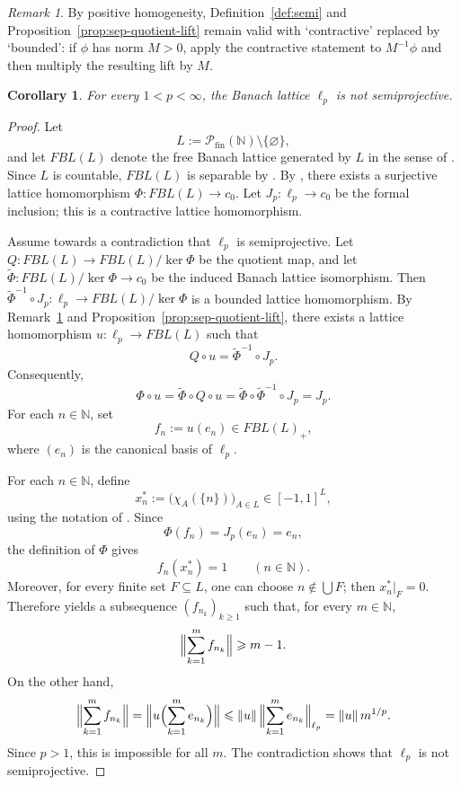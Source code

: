 \documentclass[11pt]{amsart}
\renewcommand{\le}{\leqslant}
\renewcommand{\ge}{\geqslant}
\numberwithin{equation}{section}
\newtheorem{corollary}[theorem]{Corollary}
\theoremstyle{definition}
\theoremstyle{remark}
\newtheorem{remark}[theorem]{Remark}
\theoremstyle{plain}
\begin{document}
\begin{remark}\label{rem:bounded-homogeneity}
By positive homogeneity, Definition~\ref{def:semi} and
Proposition~\ref{prop:sep-quotient-lift} remain valid with
`contractive' replaced by `bounded':
if $\phi$ has norm $M>0$, apply the contractive statement to $M^{-1}\phi$
and then multiply the resulting lift by $M$.
\end{remark}

\begin{corollary}\label{cor:ell-p-not-semi}
For every $1<p<\infty$, the Banach lattice $\ell_p$ is not semiprojective.
\end{corollary}

\begin{proof}
Let
\[
L:=\mathcal P_{\mathrm{fin}}(\mathbb N)\setminus\{\varnothing\},
\]
and let $FBL(L)$ denote the free Banach lattice generated by $L$ in the sense of
\cite{dpw}. Since $L$ is countable, $FBL(L)$ is separable by
\cite[Theorem~8.4]{dpw}.
By \cite[Lemma~2.2]{avilaes-c0}, there exists a surjective lattice homomorphism
\(
\Phi\colon FBL(L)\to c_0.
\)
Let
\(
J_p\colon \ell_p\to c_0
\) 
be the formal inclusion; this is a contractive lattice homomorphism.

Assume towards a contradiction that $\ell_p$ is semiprojective.
Let $Q\colon FBL(L)\to FBL(L)/\ker\Phi$ be the quotient map, and let
$\widetilde\Phi\colon FBL(L)/\ker\Phi\to c_0$
be the induced Banach lattice isomorphism.
Then $\widetilde\Phi^{-1}\circ J_p\colon \ell_p\to FBL(L)/\ker\Phi$
is a bounded lattice homomorphism.
By Remark~\ref{rem:bounded-homogeneity} and
Proposition~\ref{prop:sep-quotient-lift}, there exists a lattice homomorphism
$u\colon \ell_p\to FBL(L)$ such that
\[
Q\circ u=\widetilde\Phi^{-1}\circ J_p.
\]
Consequently,
\[
\Phi\circ u
=\widetilde\Phi\circ Q\circ u
=\widetilde\Phi\circ \widetilde\Phi^{-1}\circ J_p
=J_p.
\]
For each $n\in\mathbb N$, set
\[
f_n:=u(e_n)\in FBL(L)_+,
\]
where $(e_n)$ is the canonical basis of $\ell_p$.

For each $n\in\mathbb N$, define
\[
x_n^*:=\bigl(\chi_A(\{n\})\bigr)_{A\in L}\in[-1,1]^L,
\]
using the notation of \cite[Section~2]{avilaes-c0}.
Since
\[
\Phi(f_n)=J_p(e_n)=e_n,
\]
the definition of $\Phi$ gives
\[
f_n(x_n^*)=1
\qquad (n\in\mathbb N).
\]
Moreover, for every finite set $F\subseteq L$, one can choose
$n\notin \bigcup F$; then $x_n^*|_F=0$.
Therefore \cite[Lemma~2.3]{avilaes-c0} yields a subsequence
$(f_{n_k})_{k\ge 1}$ such that, for every $m\in\mathbb N$,
\[
\Bigl\|\sum_{k=1}^m f_{n_k}\Bigr\|\ge m-1.
\]
On the other hand,
\[
\Bigl\|\sum_{k=1}^m f_{n_k}\Bigr\|
=\Bigl\|u\Bigl(\sum_{k=1}^m e_{n_k}\Bigr)\Bigr\|
\le \|u\|\,\Bigl\|\sum_{k=1}^m e_{n_k}\Bigr\|_{\ell_p}
=\|u\|\,m^{1/p}.
\]
Since $p>1$, this is impossible for all $m$.
The contradiction shows that $\ell_p$ is not semiprojective.
\end{proof}
\end{document}
